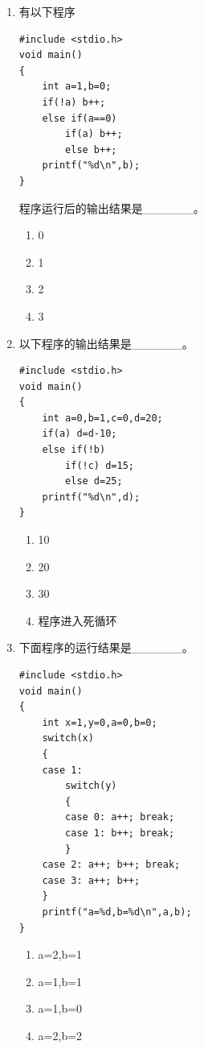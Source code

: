 \documentclass[a4paper,12pt]{article}
\begin{document}
\begin{enumerate}
	\item 有以下程序
	      \begin{verbatim}
#include <stdio.h>
void main()
{
    int a=1,b=0;
    if(!a) b++;
    else if(a==0)
        if(a) b++;
        else b++;
    printf("%d\n",b);
}
    \end{verbatim}
	      程序运行后的输出结果是\_\_\_\_\_\_。
	      \begin{enumerate}
		      \item[A)] 0
		      \item[B)] 1
		      \item[C)] 2
		      \item[D)] 3
	      \end{enumerate}
	      \vspace{0.3cm}

	\item 以下程序的输出结果是\_\_\_\_\_\_。
	      \begin{verbatim}
#include <stdio.h>
void main()
{
    int a=0,b=1,c=0,d=20;
    if(a) d=d-10;
    else if(!b)
        if(!c) d=15;
        else d=25;
    printf("%d\n",d);
}
    \end{verbatim}
	      \begin{enumerate}
		      \item[A)] 10
		      \item[B)] 20
		      \item[C)] 30
		      \item[D)] 程序进入死循环
	      \end{enumerate}
	      \vspace{0.3cm}

	\item 下面程序的运行结果是\_\_\_\_\_\_。
	      \begin{verbatim}
#include <stdio.h>
void main()
{
    int x=1,y=0,a=0,b=0;
    switch(x)
    {
    case 1:
        switch(y)
        {
        case 0: a++; break;
        case 1: b++; break;
        }
    case 2: a++; b++; break;
    case 3: a++; b++;
    }
    printf("a=%d,b=%d\n",a,b);
}
    \end{verbatim}
	      \begin{enumerate}
		      \item[A)] a=2,b=1
		      \item[B)] a=1,b=1
		      \item[C)] a=1,b=0
		      \item[D)] a=2,b=2
	      \end{enumerate}
	      \vspace{0.3cm}


\end{enumerate}
\end{document}
